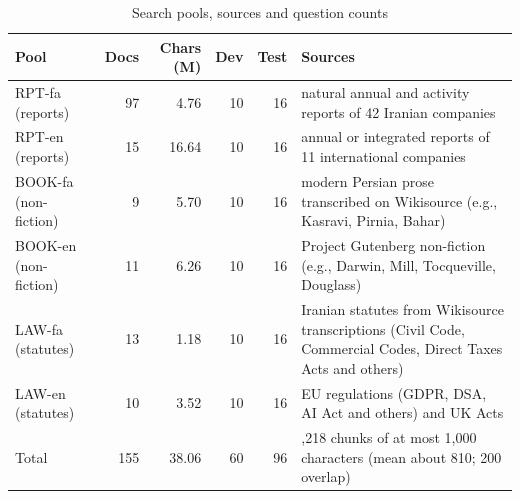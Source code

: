 \begin{table}[tp]
\caption{Search pools, sources and question counts}
\label{tab:pools}
\centering
\small
\begin{tabularx}{\textwidth}{@{}lrrrr>{\raggedright\arraybackslash}X@{}}
\toprule
Pool & Docs & Chars (M) & Dev & Test & Sources \\
\midrule
RPT-fa (reports) & 97 & 4.76 & 10 & 16 & natural annual and activity reports of 42 Iranian companies \\
RPT-en (reports) & 15 & 16.64 & 10 & 16 & annual or integrated reports of 11 international companies \\
BOOK-fa (non-fiction) & 9 & 5.70 & 10 & 16 & modern Persian prose transcribed on Wikisource (e.g., Kasravi, Pirnia, Bahar) \\
BOOK-en (non-fiction) & 11 & 6.26 & 10 & 16 & Project Gutenberg non-fiction (e.g., Darwin, Mill, Tocqueville, Douglass) \\
LAW-fa (statutes) & 13 & 1.18 & 10 & 16 & Iranian statutes from Wikisource transcriptions (Civil Code, Commercial Codes, Direct Taxes Acts and others) \\
LAW-en (statutes) & 10 & 3.52 & 10 & 16 & EU regulations (GDPR, DSA, AI Act and others) and UK Acts \\
\midrule
Total & 155 & 38.06 & 60 & 96 & 58,218 chunks of at most 1,000 characters (mean about 810; 200 overlap) \\
\bottomrule
\end{tabularx}
\end{table}
